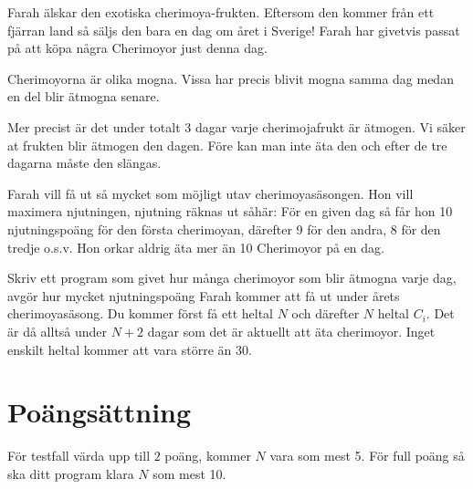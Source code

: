 
Farah älskar den exotiska cherimoya-frukten. Eftersom den kommer från ett
fjärran land så säljs den bara en dag om året i Sverige! Farah har givetvis
passat på att köpa några Cherimoyor just denna dag.

Cherimoyorna är olika mogna. Vissa har precis blivit mogna samma dag medan en
del blir ätmogna senare.

Mer precist är det under totalt 3 dagar varje cherimojafrukt är ätmogen. Vi
säker at frukten blir ätmogen den dagen. Före kan man inte äta den och efter de
tre dagarna måste den slängas.

Farah vill få ut så mycket som möjligt utav cherimoyasäsongen. Hon vill
maximera njutningen, njutning räknas ut såhär: För en given dag så får hon 10
njutningspoäng för den första cherimoyan, därefter 9 för den andra, 8 för den
tredje o.s.v. Hon orkar aldrig äta mer än 10 Cherimoyor på en dag.

Skriv ett program som givet hur många cherimoyor som blir ätmogna varje dag,
avgör hur mycket njutningspoäng Farah kommer att få ut under årets
cherimoyasäsong. Du kommer först få ett heltal $N$ och därefter $N$ heltal
$C_i$. Det är då alltså under $N+2$ dagar som det är aktuellt att äta cherimoyor.
Inget enskilt heltal kommer att vara större än 30.

\section*{Poängsättning}

För testfall värda upp till $2$ poäng, kommer $N$ vara som mest 5. För full
poäng så ska ditt program klara $N$ som mest 10.
